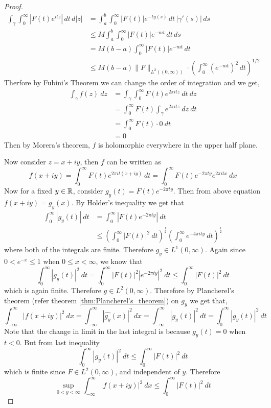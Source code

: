 \begin{proof}
  \begin{align*}
    \int_{\gamma}\int_{0}^{\infty}|F(t)e^{itz}|\,dt\,d|z|&=
    \int_a^b\int_{0}^{\infty}|F(t)|e^{-ty(s)}\,dt\,|\gamma'(s)|\,ds\\
    &\leq M\int_a^b\int_{0}^{\infty}|F(t)|e^{-mt}\,dt\,ds\\
    &=M(b-a)\int_{0}^{\infty}|F(t)|e^{-mt}\,dt\\
    &\leq M(b-a)\|F\|_{L^2((0,\infty))}\cdot\left(\int_{0}^{\infty}(e^{-mt})^2\,dt\right)^{1/2}
  \end{align*}
  Therfore by Fubini's Theorem we can change the order of integration and we get, 
  \begin{align*}
    \int_\gamma f(z)\ dz &= \int_\gamma \int_0^\infty F(t) e^{2\pi i t z} \ dt \ dz \\
    & = \int_0^\infty F(t) \int_\gamma e^{2\pi itz} \ dz \ dt \\
    & = \int_0^\infty F(t) \cdot 0 \ dt \\
    & = 0
  \end{align*}
  Then by Morera's theorem, $f$ is holomorphic everywhere in the upper half plane.  

  Now consider $z=x+iy$, then $f$ can be written as $$f(x+iy) = \int_0^\infty F(t)e^{2\pi i t (x+iy)}\ dt = \int_0^\infty F(t)e^{-2\pi ty}e^{2\pi i tx} \ dx$$ 
  Now for a fixed $y \in \mathbb R$, consider $g_y(t) = F(t)e^{-2\pi ty}$. Then from above equation $f(x+iy) = \widehat{g_y}(x)$. By Holder's inequality we get that 
  \begin{align*}
    \int_0^\infty |g_y(t)| \ dt &= \int_0^\infty \left|F(t)e^{-2\pi ty}\right| \ dt \\
    &\le \left(\int_0^\infty \left|F(t)\right|^2 \ dt \right)^{\frac{1}{2}} \left(\int_0^\infty e^{-4\pi ity} \ dt \right)^{\frac{1}{2}}
  \end{align*}
  where both of the integrals are finite. Therefore $g_y \in L^1(0, \infty)$. Again since $0<e^{-x}\le1$ when $0\le x<\infty$, we know that $$\int_0^\infty |g_y(t)|^2 \ dt = \int_0^\infty \left|F(t)\right|^2 \left| e^{-2\pi ty} \right|^2 \ dt \le \int_0^\infty \left|F(t)\right|^2 \ dt$$
  which is again finite. Therefore $g\in L^2(0, \infty)$. Therefore by Plancherel's theorem (refer theorem \ref{thm:Plancherel's_theorem}) on $g_y$ we get that, $$\int_{-\infty}^{\infty}\left|f(x+iy)\right|^2 \ dx = \int_{-\infty}^{\infty} \left|\widehat{g_y}(x)\right|^2 \ dx= \int_{-\infty}^{\infty} \left|g_y(t)\right|^2 \ dt = \int_0^\infty \left|g_y(t)\right|^2 \ dt $$
Note that the change in limit in the last integral is because $g_y(t) = 0$ when $t < 0$. But from last inequality $$\int_0^\infty \left|g_y(t)\right|^2 \ dt \le \int_0^\infty \left|F(t)\right|^2 \ dt$$
  which is finite since $F \in L^2(0, \infty)$, and independent of $y$. Therefore $$\sup_{0<y<\infty} \int_{-\infty}^\infty \left|f(x+iy)\right|^2 \ dx \le \int_0^\infty \left|F(t)\right|^2 \ dt $$
\end{proof}

